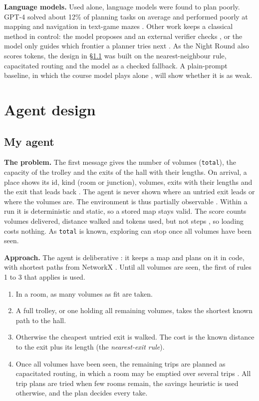 \documentclass[11pt,a4paper]{article}
\newcommand\code[1]{\texttt{#1}}
\newcommand\secref[1]{\hyperref[#1]{\S\ref*{#1}}}
\newcommand\lead[1]{\vspace{-\parskip}\textbf{#1}}
\begin{document}
\lead{Language models.} Used alone, language models were found to plan poorly. GPT-4 solved about 12\% of planning tasks on average \parencite{valmeekam2023planning} and performed poorly at mapping
and navigation in text-game mazes \parencite{ding2024mango}. Other work keeps a classical method in
control: the model proposes and an external verifier checks \parencite{kambhampati2024position}, or the model
only guides which frontier a planner tries next \parencite{shah2023navigation}. As the Night Round also scores
tokens, the design in
\secref{sec:agent} was built on the nearest-neighbour rule, capacitated routing and the model as a checked
fallback. A plain-prompt baseline, in which the course model plays alone \parencite{course-s4}, will show whether
it is as weak.

\section{Agent design}

\subsection{My agent}\label{sec:agent}

\textbf{The problem.} The first message gives the number of volumes (\code{total}), the capacity of the trolley and the exits of the hall with their lengths. On arrival, a place shows its id, kind (room or junction), volumes, exits with their lengths and the exit that leads back \parencite{course-s4}. The agent is never shown where an untried exit leads or where the volumes are. The environment is thus partially observable \parencite{russell2021artificial,course-s1}. Within a run it is deterministic and static, so a stored map stays valid. The score counts volumes delivered, distance walked and tokens used, but not steps \parencite{course-api}, so loading costs nothing. As \code{total} is known, exploring can stop once all volumes have been seen.

\lead{Approach.} The agent is deliberative \parencite{course-s1}: it keeps a map and plans on it in code, with shortest
paths from NetworkX \parencite{hagberg2008exploring}. Until all volumes are seen, the first of rules 1 to 3 that
applies is used.
\begin{enumerate}[nosep,leftmargin=1.6em]
  \item In a room, as many volumes as fit are taken.
  \item A full trolley, or one holding all remaining volumes, takes the shortest known path to the hall.
  \item Otherwise the cheapest untried exit is walked. The cost is the known distance to the exit plus its
        length (the \emph{nearest-exit rule}).
  \item Once all volumes have been seen, the remaining trips are planned as capacitated routing, in which
        a room may be emptied over several trips \parencite{course-api}. All trip plans are tried when few
        rooms remain, the savings heuristic is used otherwise, and the plan decides every take.
\end{enumerate}
\end{document}
